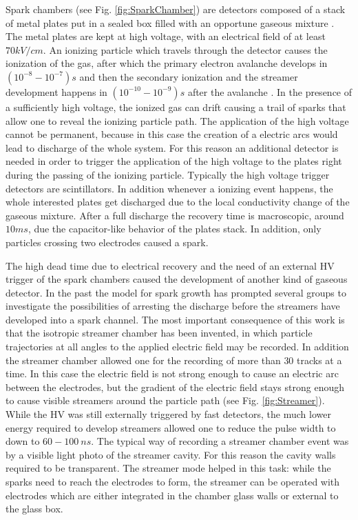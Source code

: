 Spark chambers (see Fig. \ref{fig:SparkChamber}) are detectors composed of a stack of metal plates put in a sealed box filled with an opportune gaseous mixture \cite{wenzel:1966}.
The metal plates are kept at high voltage, with an electrical field of at least $70 kV/cm$.
An ionizing particle which travels through the detector causes the ionization of the gas, after which the primary electron avalanche develops in $(10^{-8}-10^{-7})s$ and then the secondary ionization and the streamer development happens in $(10^{-10}-10^{-9})s$ after the avalanche \cite{wenzel:1966}.
In the presence of a sufficiently high voltage, the ionized gas can drift causing a trail of sparks that allow one to reveal the ionizing particle path.
The application of the high voltage cannot be permanent, because in this case the creation of a electric arcs would lead to discharge of the whole system.
For this reason an additional detector is needed in order to trigger the application of the high voltage to the plates right during the passing of the ionizing particle.
Typically the high voltage trigger detectors are scintillators. 
In addition whenever a ionizing event happens, the whole interested plates get discharged due to the local conductivity change of the gaseous mixture.
After a full discharge the recovery time is macroscopic, around $10ms$, due the capacitor-like behavior of the plates stack.
In addition, only particles crossing two electrodes caused a spark.

The high dead time due to electrical recovery and the need of an external HV trigger of the spark chambers caused the development of another kind of gaseous detector.
In the past the model for spark growth has prompted several groups \cite{chicovani:1964} to investigate the possibilities of arresting the discharge before the streamers have developed into a spark channel.
The most important consequence of this work is that the isotropic streamer chamber has been invented, in which particle trajectories at all angles to the applied electric field may be recorded.
In addition the streamer chamber allowed one for the recording of more than $30$ tracks at a time.
In this case the electric field is not strong enough to cause an electric arc between the electrodes, but the gradient of the electric field stays strong enough to cause visible streamers around the particle path (see Fig. \ref{fig:Streamer}).
While the HV was still externally triggered by fast detectors, the much lower energy required to develop streamers allowed one to reduce the pulse width to down to $60-100\ ns$.
The typical way of recording a streamer chamber event was by a visible light photo of the streamer cavity.
For this reason the cavity walls required to be transparent.
The streamer mode helped in this task: while the sparks need to reach the electrodes to form, the streamer can be operated with electrodes which are either integrated in the chamber glass walls or external to the glass box.

